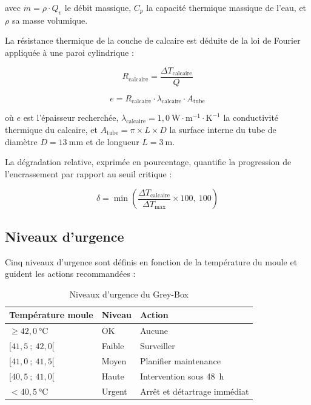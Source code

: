 avec \(\dot{m} = \rho \cdot Q_v\) le débit massique, \(C_p\) la capacité thermique massique de l'eau, et \(\rho\) sa masse volumique.

La résistance thermique de la couche de calcaire est déduite de la loi de Fourier appliquée à une paroi cylindrique :

\begin{equation}
R_{\text{calcaire}} = \frac{\Delta T_{\text{calcaire}}}{Q}
\label{eq:resistance}
\end{equation}

\begin{equation}
e = R_{\text{calcaire}} \cdot \lambda_{\text{calcaire}} \cdot A_{\text{tube}}
\label{eq:epaisseur}
\end{equation}

où \(e\) est l'épaisseur recherchée, \(\lambda_{\text{calcaire}} = 1,0~\text{W}\cdot\text{m}^{-1}\cdot\text{K}^{-1}\) la conductivité thermique du calcaire, et \(A_{\text{tube}} = \pi \times L \times D\) la surface interne du tube de diamètre \(D = 13~\text{mm}\) et de longueur \(L = 3~\text{m}\).

La dégradation relative, exprimée en pourcentage, quantifie la progression de l'encrassement par rapport au seuil critique :

\begin{equation}
\delta = \min\left(\frac{\Delta T_{\text{calcaire}}}{\Delta T_{\text{max}}} \times 100,~100\right)
\label{eq:degradation}
\end{equation}

\subsection{Niveaux d'urgence}

Cinq niveaux d'urgence sont définis en fonction de la température du moule et guident les actions recommandées :

\begin{table}[htbp]
\centering
\caption{Niveaux d'urgence du Grey-Box}
\label{tab:urgence}
\begin{tabular}{p{}p{}p{}}
\toprule
\textbf{Température moule} & \textbf{Niveau} & \textbf{Action} \\
\midrule
\(\geq 42,0~\si{\celsius}\) & OK & Aucune \\
\([41,5~;~42,0[\) & Faible & Surveiller \\
\([41,0~;~41,5[\) & Moyen & Planifier maintenance \\
\([40,5~;~41,0[\) & Haute & Intervention sous 48~h \\
\(< 40,5~\si{\celsius}\) & Urgent & Arrêt et détartrage immédiat \\
\bottomrule
\end{tabular}
\end{table}

